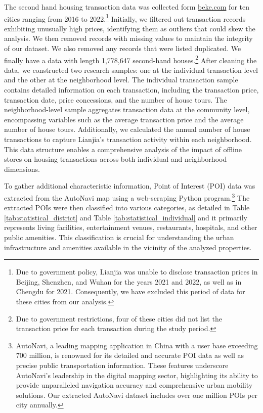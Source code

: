 \documentclass[11pt]{article}
\begin{document}
The second hand housing transaction data was collected form \href{https://www.ke.com/city/}{beke.com} for ten cities ranging from 2016 to 2022.\footnote{Due to government policy, Lianjia was unable to disclose transaction prices in Beijing, Shenzhen, and Wuhan for the years 2021 and 2022, as well as in Chengdu for 2021. Consequently, we have excluded this period of data for these cities from our analysis.} Initially, we filtered out transaction records exhibiting unusually high prices, identifying them as outliers that could skew the analysis. We then removed records with missing values to maintain the integrity of our dataset. We also removed any records that were listed duplicated. We finally have a data with length 1,778,647 second-hand houses.\footnote{Due to government restrictions, four of these cities did not list the transaction price for each transaction during the study period.} After cleaning the data, we constructed two research samples: one at the individual transaction level and the other at the neighborhood level. The individual transaction sample contains detailed information on each transaction, including the transaction price, transaction date, price concessions, and the number of house tours. The neighborhood-level sample aggregates transaction data at the community level, encompassing variables such as the average transaction price and the average number of house tours. Additionally, we calculated the annual number of house transactions to capture Lianjia's transaction activity within each neighborhood. This data structure enables a comprehensive analysis of the impact of offline stores on housing transactions across both individual and neighborhood dimensions.

To gather additional characteristic information, Point of Interest (POI) data was extracted from the AutoNavi map using a web-scraping Python program.\footnote{AutoNavi, a leading mapping application in China with a user base exceeding 700 million, is renowned for its detailed and accurate POI data as well as precise public transportation information. These features underscore AutoNavi's leadership in the digital mapping sector, highlighting its ability to provide unparalleled navigation accuracy and comprehensive urban mobility solutions. Our extracted AutoNavi dataset includes over one million POIs per city annually.} The extracted POIs were then classified into various categories, as detailed in Table \ref{tab:statistical_district} and Table \ref{tab:statistical_individual} and it primarily represents living facilities, entertainment venues, restaurants, hospitals, and other public amenities. This classification is crucial for understanding the urban infrastructure and amenities available in the vicinity of the analyzed properties.
\end{document}
